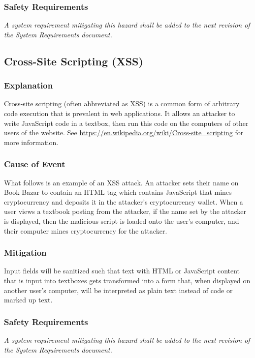 \documentclass[fullpage]{article}
\begin{document}
\subsubsection*{Safety Requirements}
\emph{A system requirement mitigating this hazard shall be added to the next revision of the System Requirements document.}

\subsection{Cross-Site Scripting (XSS)}

\subsubsection*{Explanation}
Cross-site scripting (often abbreviated as XSS) is a common form of arbitrary code execution that is prevalent in web applications. It allows an attacker to write JavaScript code in a textbox, then run this code on the computers of other users of the website. See \url{https://en.wikipedia.org/wiki/Cross-site_scripting}  for more information.

\subsubsection*{Cause of Event}
What follows is an example of an XSS attack. An attacker sets their name on Book Bazar to contain an HTML tag which contains JavaScript that mines cryptocurrency and deposits it in the attacker’s cryptocurrency wallet. When a user views a textbook posting from the attacker, if the name set by the attacker is displayed, then the malicious script is loaded onto the user’s computer, and their computer mines cryptocurrency for the attacker.

\subsubsection*{Mitigation}
Input fields will be sanitized such that text with HTML or JavaScript content that is input into textboxes gets transformed into a form that, when displayed on another user's computer, will be interpreted as plain text instead of code or marked up text.

\subsubsection*{Safety Requirements}
\emph{A system requirement mitigating this hazard shall be added to the next revision of the System Requirements document.}
\end{document}

